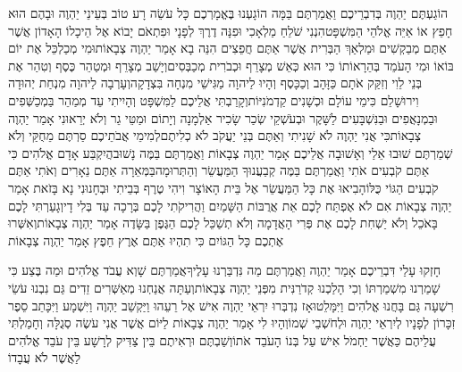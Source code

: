 \documentclass[../main/main.tex]{subfiles}
\begin{document}
\begin{multicols*}{\ncols}
הוֹגַעְתֶּם יַהְוֶה בְּדִבְרֵיכֶם וַאֲמַרְתֶּם בַּמָּה הוֹגָעְנוּ בֶּאֱמָרְכֶם כָּל עֹשֵׂה רָע טוֹב בְּעֵינֵי יַהְוֶה וּבָהֶם הוּא חָפֵץ אוֹ אַיֵּה אֱלֹהֵי הַמִּשְׁפָּט\PreChapterSpace{}הִנְנִי שֹׁלֵחַ מַלְאָכִי וּפִנָּה דֶרֶךְ לְפָנָי וּפִתְאֹם יָבוֹא אֶל הֵיכָלוֹ הָאָדוֹן אֲשֶׁר אַתֶּם מְבַקְשִׁים וּמַלְאַךְ הַבְּרִית אֲשֶׁר אַתֶּם חֲפֵצִים הִנֵּה בָא אָמַר יַהְוֶה צְבָאוֹת\PreVerseSpace{}וּמִי מְכַלְכֵּל אֶת יוֹם בּוֹאוֹ וּמִי הָעֹמֵד בְּהֵרָאוֹתוֹ כִּי הוּא כְּאֵשׁ מְצָרֵף וּכְבֹרִית מְכַבְּסִים\PreVerseSpace{}וְיָשַׁב מְצָרֵף וּמְטַהֵר כֶּסֶף וְטִהַר אֶת בְּנֵי לֵוִי וְזִקַּק אֹתָם כַּזָּהָב וְכַכָּסֶף וְהָיוּ לַיהוָה מַגִּישֵׁי מִנְחָה בִּצְדָקָה\PreVerseSpace{}וְעָרְבָה לַיהוָה מִנְחַת יְהוּדָה וִירוּשָׁלֵם כִּימֵי עוֹלָם וּכְשָׁנִים קַדְמֹנִיּוֹת\PreVerseSpace{}וְקָרַבְתִּי אֲלֵיכֶם לַמִּשְׁפָּט וְהָיִיתִי עֵד מְמַהֵר בַּמְכַשְּׁפִים וּבַמְנָאֲפִים וּבַנִּשְׁבָּעִים לַשָּׁקֶר וּבְעֹשְׁקֵי שְׂכַר שָׂכִיר אַלְמָנָה וְיָתוֹם וּמַטֵּי גֵר וְלֹא יְרֵאוּנִי אָמַר יַהְוֶה צְבָאוֹת\PreVerseSpace{}כִּי אֲנִי יַהְוֶה לֹא שָׁנִיתִי וְאַתֶּם בְּנֵי יַעֲקֹב לֹא כְלִיתֶם\PreVerseSpace{}לְמִימֵי אֲבֹתֵיכֶם סַרְתֶּם מֵחֻקַּי וְלֹא שְׁמַרְתֶּם שׁוּבוּ אֵלַי וְאָשׁוּבָה אֲלֵיכֶם אָמַר יַהְוֶה צְבָאוֹת וַאֲמַרְתֶּם בַּמֶּה נָשׁוּב\PreVerseSpace{}הֲיִקְבַּע אָדָם אֱלֹהִים כִּי אַתֶּם קֹבְעִים אֹתִי וַאֲמַרְתֶּם בַּמֶּה קְבַעֲנוּךָ הַמַּעֲשֵׂר וְהַתְּרוּמָה\PreVerseSpace{}בַּמְּאֵרָה אַתֶּם נֵאָרִים וְאֹתִי אַתֶּם קֹבְעִים הַגּוֹי כֻּלּוֹ\PreVerseSpace{}הָבִיאוּ אֶת כָּל הַמַּעֲשֵׂר אֶל בֵּית הָאוֹצָר וִיהִי טֶרֶף בְּבֵיתִי וּבְחָנוּנִי נָא בָּזֹאת אָמַר יַהְוֶה צְבָאוֹת אִם לֹא אֶפְתַּח לָכֶם אֵת אֲרֻבּוֹת הַשָּׁמַיִם וַהֲרִיקֹתִי לָכֶם בְּרָכָה עַד בְּלִי דָי\PreVerseSpace{}וְגָעַרְתִּי לָכֶם בָּאֹכֵל וְלֹא יַשְׁחִת לָכֶם אֶת פְּרִי הָאֲדָמָה וְלֹא תְשַׁכֵּל לָכֶם הַגֶּפֶן בַּשָּׂדֶה אָמַר יַהְוֶה צְבָאוֹת\PreVerseSpace{}וְאִשְּׁרוּ אֶתְכֶם כָּל הַגּוֹיִם כִּי תִהְיוּ אַתֶּם אֶרֶץ חֵפֶץ אָמַר יַהְוֶה צְבָאוֹת\OpenSection{}\par
{}חָזְקוּ עָלַי דִּבְרֵיכֶם אָמַר יַהְוֶה וַאֲמַרְתֶּם מַה נִּדְבַּרְנוּ עָלֶיךָ\PreVerseSpace{}אֲמַרְתֶּם שָׁוְא עֲבֹד אֱלֹהִים וּמַה בֶּצַע כִּי שָׁמַרְנוּ מִשְׁמַרְתּוֹ וְכִי הָלַכְנוּ קְדֹרַנִּית מִפְּנֵי יַהְוֶה צְבָאוֹת\PreVerseSpace{}וְעַתָּה אֲנַחְנוּ מְאַשְּׁרִים זֵדִים גַּם נִבְנוּ עֹשֵׂי רִשְׁעָה גַּם בָּחֲנוּ אֱלֹהִים וַיִּמָּלֵטוּ\PreVerseSpace{}אָז נִדְבְּרוּ יִרְאֵי יַהְוֶה אִישׁ אֶל\SubEnd{} רֵעֵהוּ וַיַּקְשֵׁב יַהְוֶה וַיִּשְׁמָע וַיִּכָּתֵב סֵפֶר זִכָּרוֹן לְפָנָיו לְיִרְאֵי יַהְוֶה וּלְחֹשְׁבֵי שְׁמוֹ\PreVerseSpace{}וְהָיוּ לִי אָמַר יַהְוֶה צְבָאוֹת לַיּוֹם אֲשֶׁר אֲנִי עֹשֶׂה סְגֻלָּה וְחָמַלְתִּי עֲלֵיהֶם כַּאֲשֶׁר יַחְמֹל אִישׁ עַל בְּנוֹ הָעֹבֵד אֹתוֹ\PreVerseSpace{}וְשַׁבְתֶּם וּרְאִיתֶם בֵּין צַדִּיק לְרָשָׁע בֵּין עֹבֵד אֱלֹהִים לַאֲשֶׁר לֹא עֲבָדוֹ\OpenSection{}\par

\end{multicols*}
\end{document}
